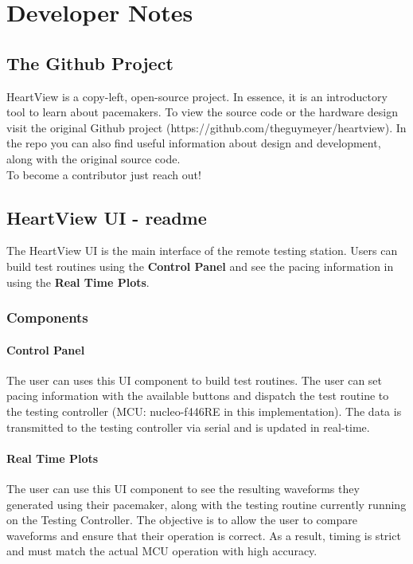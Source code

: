 \documentclass[11pt,fleqn]{book} %
\begin{document}
\chapter{Developer Notes}


\section{The Github Project}

HeartView is a copy-left, open-source project. In essence, it is an introductory tool to learn about pacemakers. To view the source code or the hardware design visit the original Github project (https://github.com/theguymeyer/heartview). In the repo you can also find useful information about design and development, along with the original source code. \\

To become a contributor just reach out!

\section{HeartView UI - readme}

The HeartView UI is the main interface of the remote testing station. Users can build test routines using the \textbf{Control Panel} and see the pacing information in using the \textbf{Real Time Plots}.

\subsection{Components}

\subsubsection{Control Panel}

The user can uses this UI component to build test routines. The user can set pacing information with the available buttons and dispatch the test routine to the testing controller (MCU: nucleo-f446RE in this implementation). The data is transmitted to the testing controller via serial and is updated in real-time.

\subsubsection{Real Time Plots}

The user can use this UI component to see the resulting waveforms they generated using their pacemaker, along with the testing routine currently running on the Testing Controller. The objective is to allow the user to compare waveforms and ensure that their operation is correct. As a result, timing is strict and must match the actual MCU operation with high accuracy. 
\end{document}
